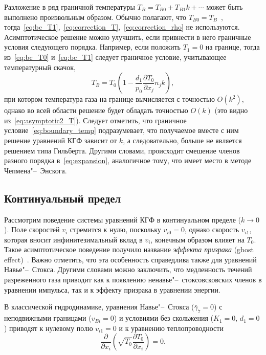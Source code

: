 \documentclass[
aps,%
12pt,%
final,%
notitlepage,%
oneside,%
onecolumn,%
nobibnotes,%
nofootinbib,%
superscriptaddress,%
noshowpacs,%
showkeys,%
centertags]%
{revtex4}
\newcommand{\pder}[2][]{\frac{\partial#1}{\partial#2}}
\newcommand{\OO}[1]{O\left(#1\right)}
\begin{document}
Разложение в ряд граничной температуры \(T_B = T_{B0} + T_{B1}k + \cdots\) может быть выполнено
произвольным образом. Обычно полагают, что \(T_{B0}=T_B\)~\cite{Sone1996, Alexandrov2002, Aoki2007},
тогда~\eqref{eq:bc_T1},~\eqref{eq:correction_T},~\eqref{eq:correction_rho} не используются.
Асимптотическое решение можно улучшить, если привнести в него граничные условия следующего порядка.
Например, если положить \(T_1=0\) на границе,
тогда из~\eqref{eq:bc_T0} и~\eqref{eq:bc_T1} следует граничное условие,
учитывающее температурный скачок,
\begin{equation}\label{eq:boundary_temp}
    T_B = T_0 \left( 1 - \frac{d_1}{p_0}\pder[T_0]{x_j}n_j k \right),
\end{equation}
при котором температура газа на границе вычисляется с точностью \(\OO{k^2}\),
однако во всей области решение будет обладать точностью \(\OO{k}\) (это видно из~\eqref{eq:asymptotic2_T}).
Следует отметить, что граничное условие~\eqref{eq:boundary_temp} подразумевает,
что получаемое вместе с ним решение уравнений КГФ зависит от \(k\),
а следовательно, больше не является решением типа Гильберта.
Другими словами, происходит смешение членов разного порядка в~\eqref{eq:expansion},
аналогичное тому, что имеет место в методе Чепмена"--~Энскога.

\subsection{Континуальный предел}

Рассмотрим поведение системы уравнений КГФ в континуальном пределе (\(k\to0\)).
Поле скоростей \(v_i\) стремится к нулю, поскольку \(v_{i0}=0\),
однако скорость \(v_{i1}\), которая вносит инфинитезимальный вклад в \(v_i\),
конечным образом влияет на \(T_0\).
Такое асимптотическое поведение получило название \emph{эффекта призрака} (ghost effect)~\cite{Sone2002, Sone2007}.
Важно отметить, что эта особенность справедлива также для уравнений Навье"--~Стокса.
Другими словами можно заключить, что медленность течений разреженного газа приводит
как к появлению ненавье"--~стоксовсковских членов в уравнении импульса,
так и к эффекту призрака в уравнении энергии.

В классической гидродинамике, уравнения Навье"--~Стокса (\(\bar{\gamma}_7=0\))
с неподвижными границами (\(v_{Bi}=0\)) и условиями без скольжения (\(K_1=0\), \(d_1=0\))
приводят к нулевому полю \(v_{i1} = 0\) и к уравнению теплопроводности
\begin{equation}\label{eq:heat_equation}
    \pder{x_i}\left(\sqrt{T_0}\pder[T_0]{x_i}\right) = 0.
\end{equation}
\end{document}
